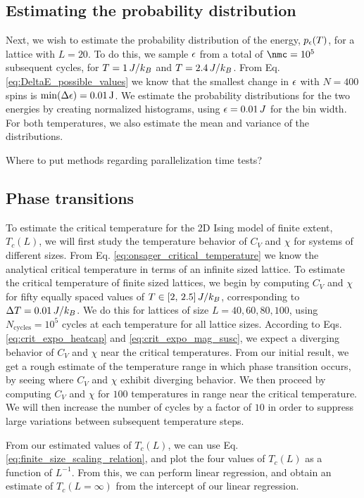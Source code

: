 

\subsection{Estimating the probability distribution}\label{subsec_methods:histogram}
Next, we wish to estimate the probability distribution of the energy, $p_\epsilon(T)$, for a lattice with $L=20$. To do this, we sample $\epsilon$ from a total of $\nmc=10^5$ subsequent cycles, for $T=1\,J/k_B$ and $T=2.4\,J/k_B$. From Eq. \eqref{eq:DeltaE_possible_values} we know that the smallest change in $\epsilon$ with $N=400$ spins is $\min(\Delta\epsilon)=0.01\,\mathrm{J}$. We estimate the probability distributions for the two energies by creating normalized histograms, using $\epsilon=0.01\,J$ for the bin width. For both temperatures, we also estimate the mean and variance of the distributions.  

\alert{Where to put methods regarding parallelization time tests?}

\subsection{Phase transitions}\label{subsec_methods:PT}
To estimate the critical temperature for the 2D Ising model of finite extent, $T_c(L)$, we will first study the temperature behavior of $C_V$ and $\chi$ for systems of different sizes. From Eq. \eqref{eq:onsager_critical_temperature} we know the analytical critical temperature in terms of an infinite sized lattice. To estimate the critical temperature of finite sized lattices, we begin by computing $C_V$ and $\chi$ for fifty equally spaced values of $T\in[2,\,2.5]\,J/k_B$, corresponding to $\Delta T = 0.01\,J/k_B$. We do this for lattices of size $L=40,60,80,100$, using $N_\mathrm{cycles}=10^5$ cycles at each temperature for all lattice sizes. According to Eqs. \eqref{eq:crit_expo_heatcap} and \eqref{eq:crit_expo_mag_susc}, we expect a diverging behavior of $C_V$ and $\chi$ near the critical temperatures. From our initial result, we get a rough estimate of the temperature range in which phase transition occurs, by seeing where $C_V$ and $\chi$ exhibit diverging behavior. We then proceed by computing $C_V$ and $\chi$ for $100$ temperatures in range near the critical temperature. We will then increase the number of cycles by a factor of $10$ in order to suppress large variations between subsequent temperature steps. 


From our estimated values of $T_c(L)$, we can use Eq. \eqref{eq:finite_size_scaling_relation}, and plot the four values of $T_c(L)$ as a function of $L^{-1}$. From this, we can perform linear regression, and obtain an estimate of $T_c(L=\infty)$ from the intercept of our linear regression. 

